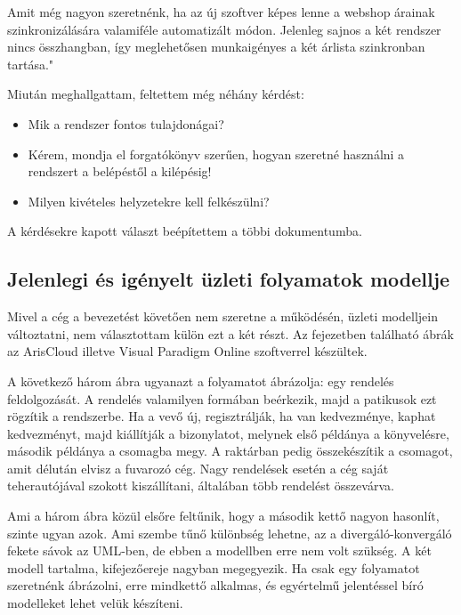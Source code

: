\documentclass[12pt]{article}
\begin{document}
Amit még nagyon szeretnénk, ha az új szoftver képes lenne a webshop árainak szinkronizálására valamiféle automatizált módon. Jelenleg sajnos a két rendszer nincs összhangban, így meglehetősen munkaigényes a két árlista szinkronban tartása."

Miután meghallgattam, feltettem még néhány kérdést:
\begin{itemize}
\item Mik a rendszer fontos tulajdonágai?
\item Kérem, mondja el forgatókönyv szerűen, hogyan szeretné használni a rendszert a belépéstől 
a kilépésig!
\item Milyen kivételes helyzetekre kell felkészülni?
\end{itemize}

A kérdésekre kapott választ beépítettem a többi dokumentumba.



\subsection{ Jelenlegi és igényelt üzleti folyamatok modellje}
Mivel a cég a bevezetést követően nem szeretne a működésén, üzleti modelljein változtatni, nem választottam külön ezt a két részt. Az fejezetben található ábrák az ArisCloud illetve Visual Paradigm Online szoftverrel készültek.

A következő három ábra ugyanazt a folyamatot ábrázolja: egy rendelés feldolgozását. A rendelés valamilyen formában beérkezik, majd a patikusok ezt rögzítik a rendszerbe. Ha a vevő új, regisztrálják, ha van kedvezménye, kaphat kedvezményt, majd  kiállítják a bizonylatot, melynek első példánya a könyvelésre, második példánya a csomagba megy. A raktárban pedig összekészítik a csomagot, amit délután elvisz a fuvarozó cég. Nagy rendelések esetén a cég saját teherautójával szokott kiszállítani, általában több rendelést összevárva.

Ami a három ábra közül elsőre feltűnik, hogy a második kettő nagyon hasonlít, szinte ugyan azok. Ami szembe tűnő különbség lehetne, az a divergáló-konvergáló fekete sávok az UML-ben, de ebben a modellben erre nem volt szükség. A két modell tartalma, kifejezőereje nagyban megegyezik. Ha csak egy folyamatot szeretnénk ábrázolni, erre mindkettő alkalmas, és egyértelmű jelentéssel bíró modelleket lehet velük készíteni.
\end{document}
